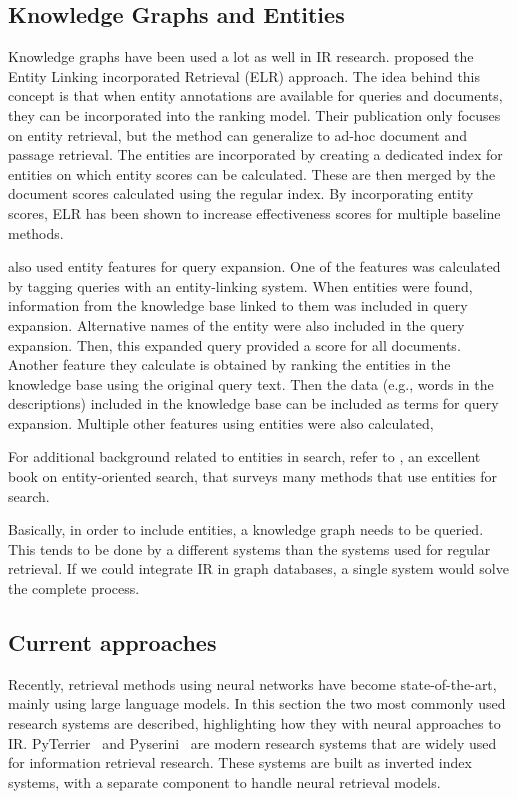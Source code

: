 \subsection{Knowledge Graphs and Entities}
Knowledge graphs have been used a lot as well in IR research.  proposed the Entity Linking incorporated Retrieval (ELR) approach. The idea behind this concept is that when entity annotations are available for queries and documents, they can be incorporated into the ranking model. Their publication only focuses on entity retrieval, but the method can generalize to ad-hoc document and passage retrieval. The entities are incorporated by creating a dedicated index for entities on which entity scores can be calculated. These are then merged by the document scores calculated using the regular index. By incorporating entity scores, ELR has been shown to increase effectiveness scores for multiple baseline methods. 

 also used entity features for query expansion. One of the features was calculated by tagging queries with an entity-linking system. When entities were found, information from the knowledge base linked to them was included in query expansion. Alternative names of the entity were also included in the query expansion. Then, this expanded query provided a score for all documents. Another feature they calculate is obtained by ranking the entities in the knowledge base using the original query text. Then the data (e.g., words in the descriptions) included in the knowledge base can be included as terms for query expansion. Multiple other features using entities were also calculated, 

For additional background related to entities in search, refer to , an excellent book on entity-oriented search, that surveys many methods that use entities for search. 

Basically, in order to include entities, a knowledge graph needs to be queried. This tends to be done by a different systems than the systems used for regular retrieval. If we could integrate IR in graph databases, a single system would solve the complete process.

\subsection{Current approaches}
Recently, retrieval methods using neural networks have become state-of-the-art, mainly using large language models. In this section the two most commonly used research systems are described, highlighting how they with neural approaches to IR.
PyTerrier~\citep{pyterrier} and Pyserini~\citep{pyserini} are modern research systems that are widely used for information retrieval research. These systems are built as inverted index systems, with a separate component to handle neural retrieval models. 

